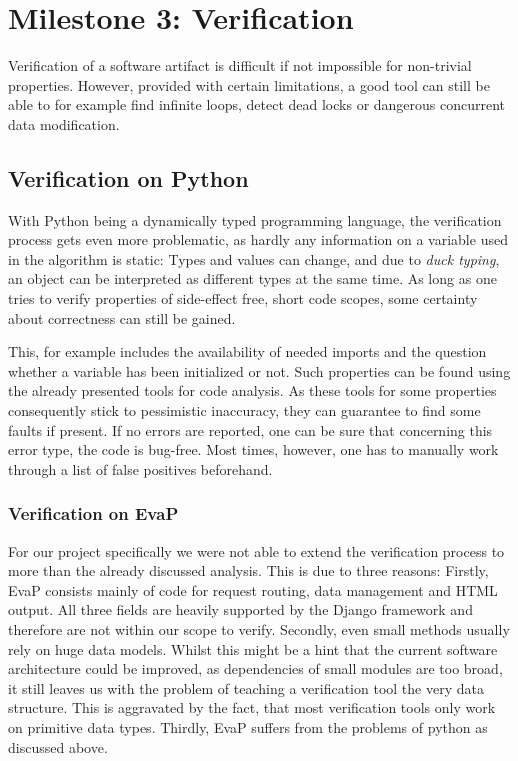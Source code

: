 \section{Milestone 3: Verification}

Verification of a software artifact is difficult if not impossible for non-trivial properties.
However, provided with certain limitations, a good tool can still be able to for example find infinite loops, detect dead locks or dangerous concurrent data modification.

\subsection{Verification on Python}

With Python being a dynamically typed programming language, the verification process gets even more problematic, as hardly any information on a variable used in the algorithm is static:
Types and values can change, and due to \textit{duck typing}, an object can be interpreted as different types at the same time.
As long as one tries to verify properties of side-effect free, short code scopes, some certainty about correctness can still be gained.

This, for example includes the availability of needed imports and the question whether a variable has been initialized or not.
Such properties can be found using the already presented tools for code analysis.
As these tools for some properties consequently stick to pessimistic inaccuracy, they can guarantee to find some faults if present.
If no errors are reported, one can be sure that concerning this error type, the code is bug-free.
Most times, however, one has to manually work through a list of false positives beforehand.

\subsubsection{Verification on EvaP}

For our project specifically we were not able to extend the verification process to more than the already discussed analysis.
This is due to three reasons:
Firstly, EvaP consists mainly of code for request routing, data management and HTML output.
All three fields are heavily supported by the Django framework and therefore are not within our scope to verify.
Secondly, even small methods usually rely on huge data models.
Whilst this might be a hint that the current software architecture could be improved, as dependencies of small modules are too broad, it still leaves us with the problem of teaching a verification tool the very data structure.
This is aggravated by the fact, that most verification tools only work on primitive data types.
Thirdly, EvaP suffers from the problems of python as discussed above.

